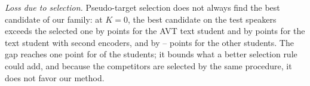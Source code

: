 \emph{Loss due to selection.}
\label{sec:comparison-selection}
Pseudo-target selection does not always find the best candidate of our family: at $K=0$, the best candidate on the test speakers exceeds the selected one by  points for the AVT text student and by  points for the text student with second encoders, and by -- points for the other students.
The gap reaches one point for  of the  students; it bounds what a better selection rule could add, and because the competitors are selected by the same procedure, it does not favor our method.
